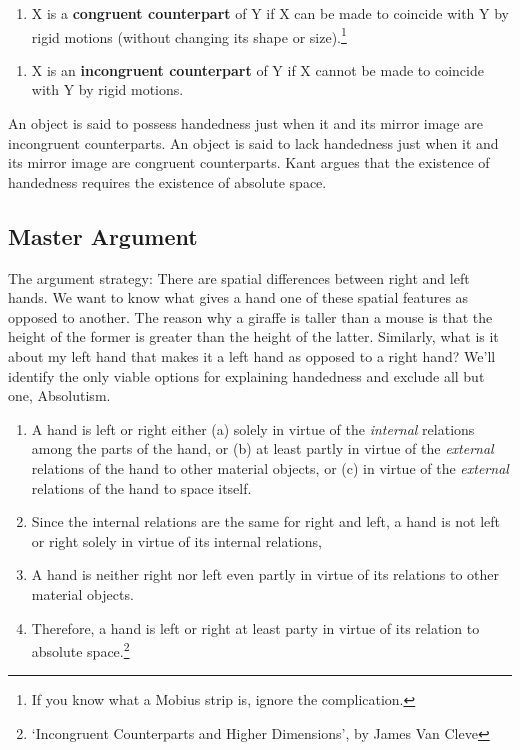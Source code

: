 \documentclass[oneside]{article}
\begin{document}
\begin{enumerate}

\item
  X is a \textbf{congruent counterpart} of Y if X can be made to
  coincide with Y by rigid motions (without changing its shape or
  size).\footnote{If you know what a Mobius strip is, ignore the
    complication.}
\end{enumerate}

\begin{enumerate}

\item
  X is an \textbf{incongruent counterpart} of Y if X cannot be made to
  coincide with Y by rigid motions.
\end{enumerate}
An object is said to possess handedness just when it and its mirror
image are incongruent counterparts. An object is said to lack handedness just when it and its mirror image are congruent counterparts. Kant argues that the existence of handedness requires the existence of absolute space.

\subsection*{Master Argument}\label{master-argument}

The argument strategy: There are spatial differences between right and
left hands. We want to know what gives a hand one of these spatial
features as opposed to another. The reason why a giraffe is taller than
a mouse is that the height of the former is greater than the height of
the latter. Similarly, what is it about my left hand that makes it a
left hand as opposed to a right hand? We'll identify the only viable
options for explaining handedness and exclude all but one, Absolutism.

\begin{enumerate}

\item
  A hand is left or right either (a) solely in virtue of the
  \emph{internal} relations among the parts of the hand, or (b) at least
  partly in virtue of the \emph{external} relations of the hand to other
  material objects, or (c) in virtue of the \emph{external} relations of
  the hand to space itself.
\item
  Since the internal relations are the same for right and left, a hand
  is not left or right solely in virtue of its internal relations,
\item
  A hand is neither right nor left even partly in virtue of its
  relations to other material objects.
\item
  Therefore, a hand is left or right at least party in virtue of its
  relation to absolute space.\footnote{`Incongruent Counterparts and
    Higher Dimensions', by James Van Cleve}
\end{enumerate}
\end{document}
